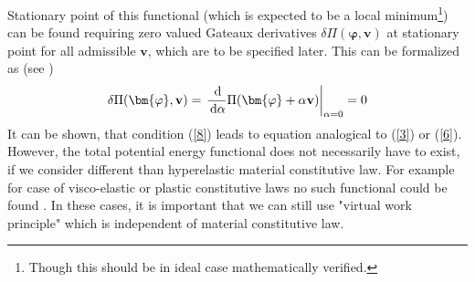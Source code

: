 \documentclass{article}
\newcommand{\beq}{\begin{equation}}
\newcommand{\eeq}{\end{equation}}
\newcommand{\dd}{\,{\rm d}}
\begin{document}
Stationary point of this functional (which is expected to be a local minimum\footnote{Though this should be in ideal case mathematically verified.}) can be found requiring zero valued Gateaux derivatives $ \delta \Pi(\bm{\varphi},\mathbf{v}) $ at stationary point for all admissible $ \mathbf{v} $, which are to be specified later. This can be formalized as (see \cite[Chapter 2, p.31]{Wriggers})
\beq\label{8}
\delta \Pi(\bm{\varphi},\mathbf{v})=\left.\frac{\dd}{\dd \alpha} \Pi(\bm{\varphi}+\alpha \mathbf{v})\right|_{\alpha=0} = 0
\eeq
It can be shown, that condition (\ref{8}) leads to equation analogical to (\ref{3}) or (\ref{6}). However, the total potential energy functional does not necessarily have to exist, if we consider different than hyperelastic material constitutive law. For example for case of visco-elastic or plastic constitutive laws no such functional could be found . In these cases, it is important that we can still use "virtual work principle" which is independent of material constitutive law.
\end{document}
